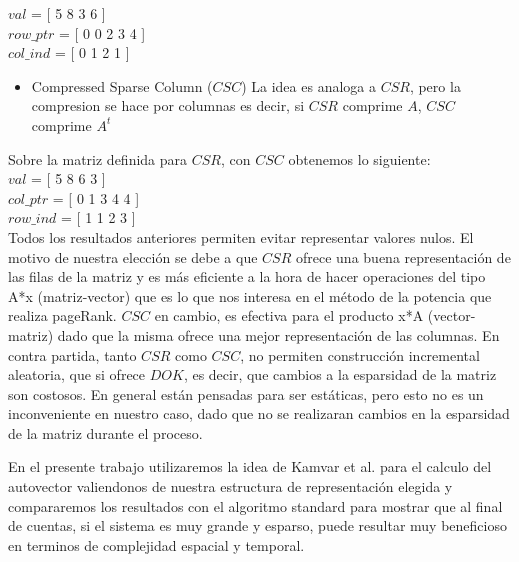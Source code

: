    $val$  = [ 5 8 3 6 ] \\
   $row\_ptr$ = [ 0 0 2 3 4 ] \\
   $col\_ind$ = [ 0 1 2 1 ] \\

\begin{itemize}
\item Compressed Sparse Column ($CSC$)
La idea es analoga a $CSR$, pero la compresion se hace por columnas es decir, si $CSR$ comprime $A$, $CSC$ comprime $A^t$  
\end{itemize}

Sobre la matriz definida para $CSR$, con $CSC$ obtenemos lo siguiente: \\

   $val$  = [ 5 8 6 3 ] \\
   $col\_ptr$ = [ 0 1 3 4 4 ] \\   
   $row\_ind$ = [ 1 1 2 3 ] \\

Todos los resultados anteriores permiten evitar representar valores nulos.	
El motivo de nuestra elección se debe a que $CSR$ ofrece una buena representación de las filas de la matriz y es más eficiente a la hora de hacer operaciones del tipo A*x (matriz-vector) que es lo que nos interesa en el método de la potencia que realiza pageRank. $CSC$ en cambio, es efectiva para el producto x*A (vector-matriz) dado que la misma ofrece una mejor representación de las columnas. En contra partida, tanto $CSR$ como $CSC$, no permiten construcción incremental aleatoria, que si ofrece $DOK$, es decir, que cambios a la esparsidad de la matriz son costosos. En general están pensadas para ser estáticas, pero esto no es un inconveniente en nuestro caso, dado que no se realizaran cambios en la esparsidad de la matriz durante el proceso.

En el presente trabajo utilizaremos la idea de Kamvar et al. \cite[Algoritmo 1]{Kamvar2003} para el calculo del autovector valiendonos de nuestra estructura de representación elegida y compararemos los resultados con el algoritmo standard para mostrar que al final de cuentas, si el sistema es muy grande y esparso, puede resultar muy beneficioso en terminos de complejidad espacial y temporal.

